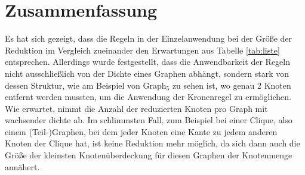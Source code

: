 \section{Zusammenfassung}
\label{ch:Analyse:sec:Zusammenfassung}

Es hat sich gezeigt, dass die Regeln in der Einzelanwendung bei der Größe der Reduktion im Vergleich zueinander den Erwartungen aus Tabelle \ref{tab:liste} entsprechen. Allerdings wurde festgestellt, dass die Anwendbarkeit der Regeln nicht ausschließlich von der Dichte eines Graphen abhängt, sondern stark von dessen Struktur, wie am Beispiel von Graph$_{5}$ zu sehen ist, wo genau 2 Knoten entfernt werden mussten, um die Anwendung der Kronenregel zu ermöglichen. Wie erwartet, nimmt die Anzahl der reduzierten Knoten pro Graph mit wachsender dichte ab. Im schlimmsten Fall, zum Beispiel bei einer Clique, also einem (Teil-)Graphen, bei dem jeder Knoten eine Kante zu jedem anderen Knoten der Clique hat, ist keine Reduktion mehr möglich, da sich dann auch die Größe der kleinsten Knotenüberdeckung für diesen Graphen der Knotenmenge annähert.

